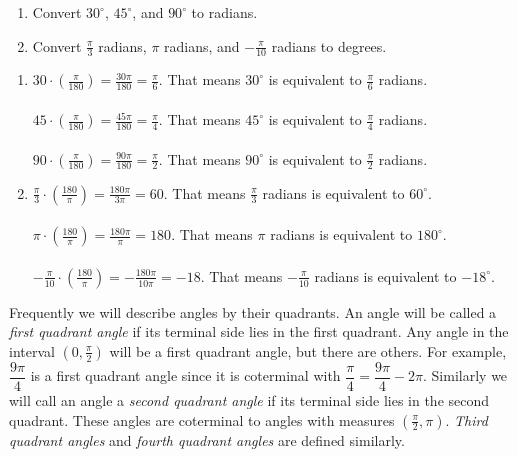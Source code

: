 \documentclass[nooutcomes]{ximera}
\begin{document}
\begin{example}
	\begin{enumerate}
		\item Convert $30^\circ$, $45^\circ$, and $90^\circ$ to radians.
		\item Convert $\frac{\pi}{3}$ radians, $\pi$ radians, and $-\frac{\pi}{10}$ radians to degrees. 
	\end{enumerate}

	\begin{explanation}

		\begin{enumerate}
			\item $30\cdot \left( \frac{\pi}{180}\right) = \frac{30\pi}{180} = \frac{\pi}{6}$. That means $30^\circ$ is equivalent to $\frac{\pi}{6}$ radians. \\ \\
				$45\cdot \left( \frac{\pi}{180}\right) = \frac{45\pi}{180} = \frac{\pi}{4}$. That means $45^\circ$ is equivalent to $\frac{\pi}{4}$ radians.  \\ \\
				$90\cdot \left( \frac{\pi}{180}\right) = \frac{90\pi}{180} = \frac{\pi}{2}$. That means $90^\circ$ is equivalent to $\frac{\pi}{2}$ radians.

			\item $\frac{\pi}{3} \cdot \left( \frac{180}{\pi}\right) = \frac{180\pi}{3\pi} = 60$. That means $\frac{\pi}{3}$ radians is equivalent to $60^\circ$. \\ \\
				$\pi \cdot \left( \frac{180}{\pi}\right) = \frac{180\pi}{\pi} = 180$. That means $\pi$ radians is equivalent to $180^\circ$. \\ \\
				$-\frac{\pi}{10} \cdot \left( \frac{180}{\pi}\right) = -\frac{180\pi}{10\pi} = -18$. That means $-\frac{\pi}{10}$ radians is equivalent to $-18^\circ$.
		\end{enumerate}		
		
	\end{explanation}
\end{example}

Frequently we will describe angles by their quadrants. An angle will be called a \emph{first quadrant angle} if its terminal side lies in the first
quadrant. Any angle in the interval $\left( 0, \frac{\pi}{2}\right)$ will be a first quadrant angle, but there are others. For example, $\dfrac{9\pi}{4}$
is a first quadrant angle since it is coterminal with $\dfrac{\pi}{4} = \dfrac{9\pi}{4}-2\pi$. Similarly we will call an angle a \emph{second quadrant angle}
if its terminal side lies in the second quadrant. These angles are coterminal to angles with measures $\left( \frac{\pi}{2}, \pi \right)$. \emph{Third quadrant angles}
and \emph{fourth quadrant angles} are defined similarly.
\end{document}
